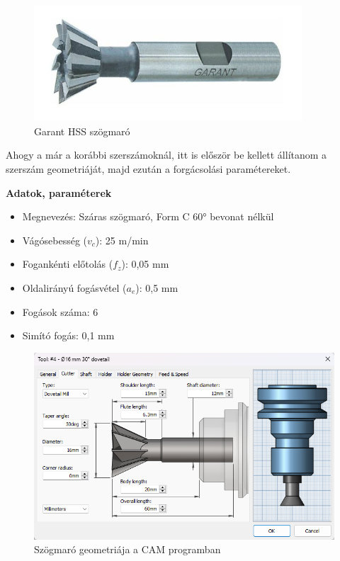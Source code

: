 \documentclass[12pt,a4paper,oneside]{report}
\begin{document}
\begin{figure}[H]
    \centering
    \includegraphics[width=10cm]{figures/szogmaro.png}
    \caption{Garant HSS szögmaró}
    \label{Fig:szogmaro}
\end{figure}

Ahogy a már a korábbi szerszámoknál, itt is először be kellett állítanom a szerszám geometriáját, majd ezután a forgácsolási paramétereket.

\textbf{Adatok, paraméterek}
\begin{itemize}
    \item Megnevezés: Száras szögmaró, Form C 60° bevonat nélkül
    \item Vágósebesség ($v_c$): 25 m/min
    \item Fogankénti előtolás ($f_z$): 0,05 mm
    \item Oldalirányú fogásvétel ($a_e$): 0,5 mm
    \item Fogások száma: 6
    \item Simító fogás: 0,1 mm
\end{itemize}

\begin{figure}[H]
    \centering
    \includegraphics[width=12cm]{figures/dovetail_geometry.png}
    \caption{Szögmaró geometriája a CAM programban}
    \label{Fig:dovetail_geometry}
\end{figure}
\end{document}
